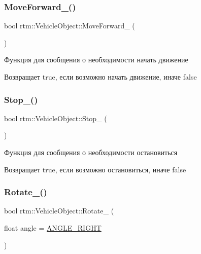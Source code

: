 \subsubsection{\texorpdfstring{Move\+Forward\+\_\+()}{MoveForward\_()}}
{\footnotesize\ttfamily bool rtm\+::\+Vehicle\+Object\+::\+Move\+Forward\+\_\+ (\begin{DoxyParamCaption}{ }\end{DoxyParamCaption})\hspace{0.3cm}{\ttfamily [protected]}}

Функция для сообщения о необходимости начать движение \begin{DoxyReturn}{Возвращает}
true, если возможно начать движение, иначе false 
\end{DoxyReturn}
\mbox{\label{classrtm_1_1_vehicle_object_a74dd5fb7b16da79e1d288738ba43ded0}} 
\subsubsection{\texorpdfstring{Stop\+\_\+()}{Stop\_()}}
{\footnotesize\ttfamily bool rtm\+::\+Vehicle\+Object\+::\+Stop\+\_\+ (\begin{DoxyParamCaption}{ }\end{DoxyParamCaption})\hspace{0.3cm}{\ttfamily [protected]}}

Функция для сообщения о необходимости остановиться \begin{DoxyReturn}{Возвращает}
true, если возможно остановиться, иначе false 
\end{DoxyReturn}
\mbox{\label{classrtm_1_1_vehicle_object_a0739284311dc651679c0c5954f240758}} 
\subsubsection{\texorpdfstring{Rotate\+\_\+()}{Rotate\_()}}
{\footnotesize\ttfamily bool rtm\+::\+Vehicle\+Object\+::\+Rotate\+\_\+ (\begin{DoxyParamCaption}\item[{float}]{angle = {\ttfamily \hyperlink{namespacertm_a39212dd73aa5a6387211cf776bdb64d8}{A\+N\+G\+L\+E\+\_\+\+R\+I\+G\+HT}} }\end{DoxyParamCaption})\hspace{0.3cm}{\ttfamily [protected]}}


